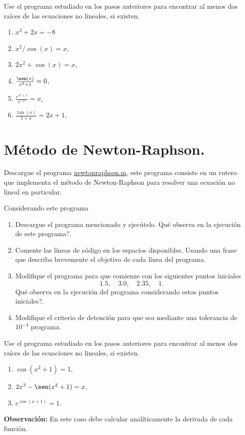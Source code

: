 \documentclass[letter,11pt]{article}
\newcommand\0{\mathbf{0}}
\begin{document}
Use el programa estudiado en los pasos anteriores para encontrar al menos dos ra\'ices de las ecuaciones no lineales, si existen.
\begin{multicols}{3}
\begin{enumerate}
	\item $x^3+2x=-8$
	\item $x^2/\cos(x)=x$,
    \item $2x^2 +\cos(x) =x$,
    \item $\frac{\sen(x)}{x^2+1}=0$,
    \item $\frac{e^{x^2+1}}{e^{-x}}=x$,
    \item $\frac{\tan(x)}{1+x}=2x+1$,
\end{enumerate}
\end{multicols}

\section{M\'etodo de Newton-Raphson.}
Descargue el programa
    \href{ftp://ftp.ing-mat.udec.cl/pub/ing-mat/asignaturas/521230/ejercicios/2018-1/newtonraphson.m}{newtonraphson.m}, este programa consiste en un rutero que implementa el m\'etodo de Newton-Raphson para resolver una ecuaci\'on no lineal en particular.
       
    Considerando este programa
\begin{enumerate}
	\item Descargue el programa mencionado y ejec\'utelo. \textquestiondown Qu\'e observa en la ejecuci\'on de este programa?.
    \item Comente las l\'ineas de c\'odigo en los espacios disponibles. Usando una frase que describa brevemente el objetivo de cada l\'inea del programa.
    \item Modifique el programa para que comienze con los siguientes puntos iniciales
    $$
    1.5, \quad 3.0, \quad 2.35, \quad 1.
    $$
    \textquestiondown Qu\'e observa en la ejecuci\'on del programa considerando estos puntos iniciales?.
   \item Modifique el criterio de detenci\'on para que sea mediante una tolerancia de $10^{-4}$ 
   programa.
\end{enumerate}

Use el programa estudiado en los pasos anteriores para encontrar al menos dos ra\'ices de las ecuaciones no lineales, si existen.
\begin{multicols}{3}
\begin{enumerate}
	\item $\cos(x^2+1)=1$,
    \item $2x^3-\sen(x^2+1)=x$,
    \item $e^{\cos(x+1)}=1$.
\end{enumerate}
\end{multicols}
\textbf{Observaci\'on:} En este caso debe calcular anal\'iticamente la derivada de cada funci\'on.
\end{document}
